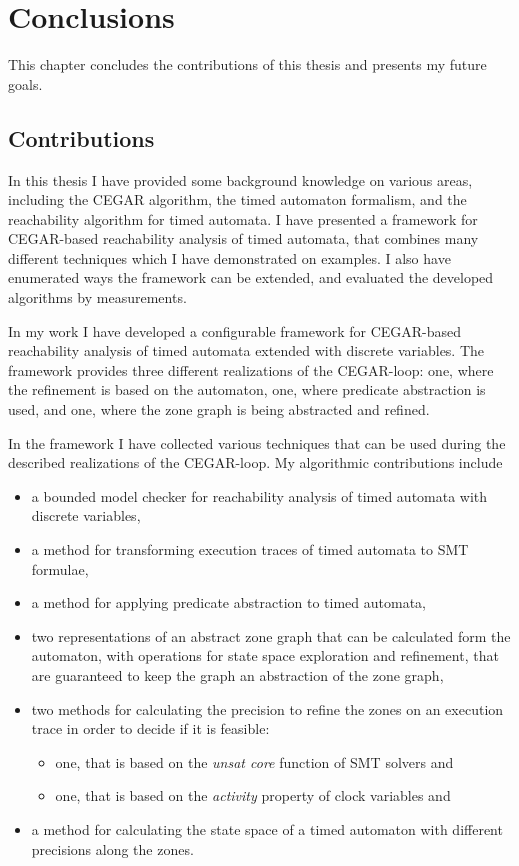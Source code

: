 \chapter{Conclusions}\label{chap:concl}

This chapter concludes the contributions of this thesis and presents my future goals.

\section{Contributions}

In this thesis I have provided some background knowledge on various areas, including the CEGAR algorithm, the timed automaton formalism, and the reachability algorithm for timed automata. I have presented a framework for CEGAR-based reachability analysis of timed automata, that combines many different techniques which I have demonstrated on examples. I also have enumerated ways the framework can be extended, and evaluated the developed algorithms by measurements.

In my work I have developed a configurable framework for CEGAR-based reachability analysis of timed automata extended with discrete variables. The framework provides three different realizations of the CEGAR-loop: one, where the refinement is based on the automaton, one, where predicate abstraction is used, and one, where the zone graph is being abstracted and refined.

In the framework I have collected various techniques that can be used during the described realizations of the CEGAR-loop. My algorithmic contributions include
\begin{itemize}
	\item a bounded model checker for reachability analysis of timed automata with discrete variables,
	\item a method for transforming execution traces of timed automata to SMT formulae, %
	\item a method for applying predicate abstraction to timed automata,
	\item two representations of an abstract zone graph that can be calculated form the automaton, with operations for state space exploration and refinement, that are guaranteed to keep the graph an abstraction of the zone graph,
	\item two methods for calculating the precision to refine the zones on an execution trace in order to decide if it is feasible:
	\begin{itemize}
		\item one, that is based on the \emph{unsat core} function of SMT solvers and
		\item one, that is based on the \emph{activity} property of clock variables and
	\end{itemize}
	\item a method for calculating the state space of a timed automaton with different precisions along the zones.
\end{itemize}

